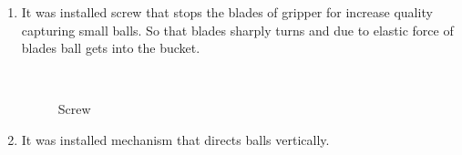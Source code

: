 \begin{enumerate}
	\item It was installed screw that stops the blades of gripper for increase quality capturing small balls. So that blades sharply turns and due to elastic force of blades ball gets into the bucket.
	\begin{figure}[H]
		\begin{minipage}[h]{0.2\linewidth}
			\center  
		\end{minipage}
		\begin{minipage}[h]{0.6\linewidth}
			\caption{Screw}
		\end{minipage}
	\end{figure}	
	
	
	\item It was installed mechanism that directs balls vertically.
	

\end{enumerate}
